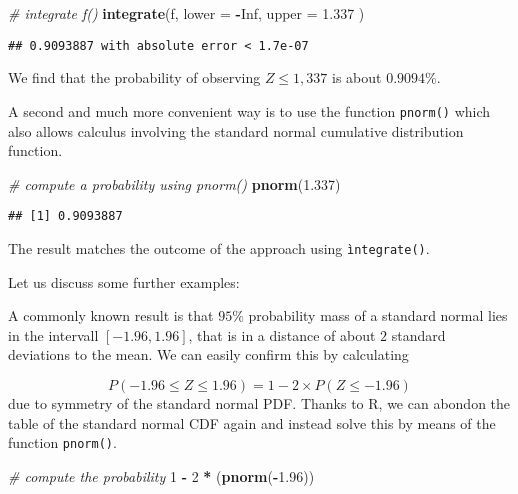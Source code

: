 \documentclass[]{book}
\newenvironment{Shaded}{\begin{snugshade}}{\end{snugshade}}
\newcommand{\KeywordTok}[1]{\textcolor[rgb]{0.13,0.29,0.53}{\textbf{#1}}}
\newcommand{\DataTypeTok}[1]{\textcolor[rgb]{0.13,0.29,0.53}{#1}}
\newcommand{\DecValTok}[1]{\textcolor[rgb]{0.00,0.00,0.81}{#1}}
\newcommand{\FloatTok}[1]{\textcolor[rgb]{0.00,0.00,0.81}{#1}}
\newcommand{\StringTok}[1]{\textcolor[rgb]{0.31,0.60,0.02}{#1}}
\newcommand{\CommentTok}[1]{\textcolor[rgb]{0.56,0.35,0.01}{\textit{#1}}}
\newcommand{\OtherTok}[1]{\textcolor[rgb]{0.56,0.35,0.01}{#1}}
\newcommand{\OperatorTok}[1]{\textcolor[rgb]{0.81,0.36,0.00}{\textbf{#1}}}
\newcommand{\NormalTok}[1]{#1}
\theoremstyle{definition}
\theoremstyle{definition}
\theoremstyle{definition}
\theoremstyle{remark}
\begin{document}
\begin{Shaded}
\begin{Highlighting}[]
\CommentTok{# integrate f()}
\KeywordTok{integrate}\NormalTok{(f, }
          \DataTypeTok{lower =} \OperatorTok{-}\OtherTok{Inf}\NormalTok{, }
          \DataTypeTok{upper =} \FloatTok{1.337}
\NormalTok{          )}
\end{Highlighting}
\end{Shaded}

\begin{verbatim}
## 0.9093887 with absolute error < 1.7e-07
\end{verbatim}

We find that the probability of observing \(Z \leq 1,337\) is about
\(0.9094\%\).

A second and much more convenient way is to use the function
\texttt{pnorm()} which also allows calculus involving the standard
normal cumulative distribution function.

\begin{Shaded}
\begin{Highlighting}[]
\CommentTok{# compute a probability using pnorm()}
\KeywordTok{pnorm}\NormalTok{(}\FloatTok{1.337}\NormalTok{)}
\end{Highlighting}
\end{Shaded}

\begin{verbatim}
## [1] 0.9093887
\end{verbatim}

The result matches the outcome of the approach using
\texttt{ìntegrate()}.

Let us discuss some further examples:

A commonly known result is that \(95\%\) probability mass of a standard
normal lies in the intervall \([-1.96, 1.96]\), that is in a distance of
about \(2\) standard deviations to the mean. We can easily confirm this
by calculating

\[ P(-1.96 \leq Z \leq 1.96) = 1-2\times P(Z \leq -1.96) \] due to
symmetry of the standard normal PDF. Thanks to R, we can abondon the
table of the standard normal CDF again and instead solve this by means
of the function \texttt{pnorm()}.

\begin{Shaded}
\begin{Highlighting}[]
\CommentTok{# compute the probability}
\DecValTok{1} \OperatorTok{-}\StringTok{ }\DecValTok{2} \OperatorTok{*}\StringTok{ }\NormalTok{(}\KeywordTok{pnorm}\NormalTok{(}\OperatorTok{-}\FloatTok{1.96}\NormalTok{)) }
\end{Highlighting}
\end{Shaded}
\end{document}
